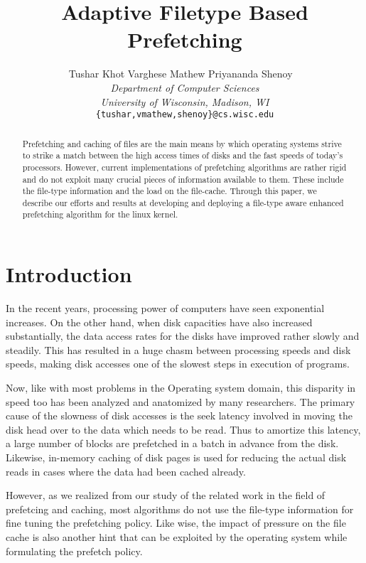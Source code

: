 \documentclass[twocolumn,10pt]{article}
\title{\bf \textsf{Adaptive Filetype Based Prefetching}}
\author{ Tushar Khot \hspace{20pt} Varghese Mathew \hspace{20pt}  Priyananda Shenoy \
\\
       {\em \normalsize Department of Computer Sciences}\\
       {\em \normalsize University of Wisconsin, Madison, WI}\\
       {\tt \normalsize \{tushar,vmathew,shenoy\}@cs.wisc.edu}}
\begin{document}
\date{}
\raggedbottom

\maketitle

\pagestyle{plain}\setlength{\footskip}{25pt}

\onehalfspacing

\begin{abstract}
\small
Prefetching and caching of files are the main means by which operating 
systems strive to strike a match between the high access times of disks
and the fast speeds of today's processors. However, 
current implementations of prefetching algorithms are rather rigid and
do not exploit many crucial pieces of information available to them.
These include the file-type information and the load on the file-cache.
Through this paper, we describe our efforts and results at developing
and deploying a file-type aware enhanced prefetching algorithm for the
linux kernel.
\end{abstract}

\section{Introduction}
In the recent years, processing power of computers have seen exponential
increases. On the other hand, when disk capacities have also increased
substantially, the data access rates for the disks have improved rather
slowly and steadily. This has resulted in a huge chasm between processing
speeds and disk speeds, making disk accesses one of the slowest steps in
execution of programs.

Now, like with most problems in the Operating system domain, this 
disparity in speed too has been analyzed and anatomized by many 
researchers. The primary cause of the slowness of disk accesses is the
seek latency involved in moving the disk head over to the data which 
needs to be read. Thus to amortize this latency, a large number of blocks 
are prefetched in a batch in advance from the disk. Likewise, in-memory
caching of disk pages is used for reducing the actual disk reads in cases
where the data had been cached already.

However, as we realized from our study of the related work in the field of
prefetcing and caching, most algorithms do not use the file-type information 
for fine tuning the prefetching policy. Like wise, the impact of pressure on 
the file cache is also another hint that can be exploited
by the operating system while formulating the prefetch policy.
\end{document}
